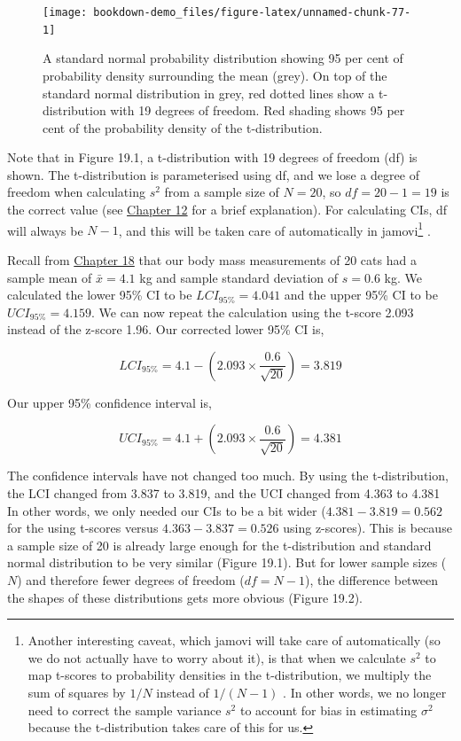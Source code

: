 \documentclass[
  openany]{scrbook}
\begin{document}
\begin{figure}
\texttt{[image: bookdown-demo\_files/figure-latex/unnamed-chunk-77-1]} \caption{A standard normal probability distribution showing 95 per cent of probability density surrounding the mean (grey). On top of the standard normal distribution in grey, red dotted lines show a t-distribution with 19 degrees of freedom. Red shading shows 95 per cent of the probability density of the t-distribution.}\label{fig:unnamed-chunk-77}
\end{figure}

Note that in Figure 19.1, a t-distribution with 19 degrees of freedom (df) is shown.
The t-distribution is parameterised using df, and we lose a degree of freedom when calculating \(s^{2}\) from a sample size of \(N = 20\), so \(df = 20 - 1 = 19\) is the correct value (see \protect\hyperlink{Chapter_12}{Chapter 12} for a brief explanation).
For calculating CIs, df will always be \(N - 1\), and this will be taken care of automatically in jamovi\footnote{Another interesting caveat, which jamovi will take care of automatically (so we do not actually have to worry about it), is that when we calculate \(s^{2}\) to map t-scores to probability densities in the t-distribution, we multiply the sum of squares by \(1/N\) instead of \(1/(N-1)\) \citep{Sokal1995}. In other words, we no longer need to correct the sample variance \(s^{2}\) to account for bias in estimating \(\sigma^{2}\) because the t-distribution takes care of this for us.} \citep{Jamovi2022}.

Recall from \protect\hyperlink{Chapter_18}{Chapter 18} that our body mass measurements of 20 cats had a sample mean of \(\bar{x} = 4.1\) kg and sample standard deviation of \(s = 0.6\) kg. We calculated the lower 95\% CI to be \(LCI_{95\%} = 4.041\) and the upper 95\% CI to be \(UCI_{95\%} = 4.159\). We can now repeat the calculation using the t-score 2.093 instead of the z-score 1.96.
Our corrected lower 95\% CI is,

\[LCI_{95\%} = 4.1 - \left(2.093 \times \frac{0.6}{\sqrt{20}}\right) = 3.819\]

Our upper 95\% confidence interval is,

\[UCI_{95\%} = 4.1 + \left(2.093 \times \frac{0.6}{\sqrt{20}}\right) = 4.381\]

The confidence intervals have not changed too much.
By using the t-distribution, the LCI changed from 3.837 to 3.819, and the UCI changed from 4.363 to 4.381
In other words, we only needed our CIs to be a bit wider (\(4.381 - 3.819 = 0.562\) for the using t-scores versus \(4.363 - 3.837 = 0.526\) using z-scores).
This is because a sample size of 20 is already large enough for the t-distribution and standard normal distribution to be very similar (Figure 19.1).
But for lower sample sizes (\(N\)) and therefore fewer degrees of freedom (\(df = N - 1\)), the difference between the shapes of these distributions gets more obvious (Figure 19.2).
\end{document}
